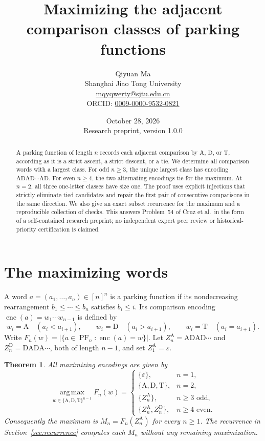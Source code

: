 \documentclass[11pt]{article}
\title{Maximizing the adjacent comparison classes of parking functions}
\author{Qiyuan Ma\\
  \small Shanghai Jiao Tong University\\
  \small \href{mailto:mqyqwerty@sjtu.edu.cn}{mqyqwerty@sjtu.edu.cn}\\
  \small ORCID: \href{https://orcid.org/0009-0000-9532-0821}{0009-0000-9532-0821}}
\date{October 28, 2026\\ \small Research preprint, version 1.0.0}
\newtheorem{theorem}{Theorem}[section]
\theoremstyle{definition}
\newcommand{\PF}{\operatorname{PF}}
\newcommand{\enc}{\operatorname{enc}}
\newcommand{\A}{\mathrm A}
\newcommand{\D}{\mathrm D}
\newcommand{\T}{\mathrm T}
\newcommand{\eps}{\varepsilon}
\begin{document}
\maketitle
\begin{abstract}
A parking function of length $n$ records each adjacent comparison by
$\A$, $\D$, or $\T$, according as it is a strict ascent, a strict descent,
or a tie. We determine all comparison words with a largest class.
For odd $n\ge3$, the unique largest class has encoding
$\A\D\A\D\cdots\A\D$. For even $n\ge4$, the two alternating
encodings tie for the maximum. At $n=2$, all three one-letter classes
have size one. The proof uses explicit injections that strictly eliminate
tied candidates and repair the first pair of consecutive comparisons
in the same direction. We also give an exact subset recurrence for the
maximum and a reproducible collection of checks. This answers
Problem~54 of Cruz et al.\ in the form of a self-contained research
preprint; no independent expert peer review or historical-priority
certification is claimed.
\end{abstract}

\section{The maximizing words}
A word $a=(a_1,\ldots,a_n)\in[n]^n$ is a parking function if its
nondecreasing rearrangement $b_1\le\cdots\le b_n$ satisfies $b_i\le i$.
Its comparison encoding $\enc(a)=w_1\cdots w_{n-1}$ is defined by
\[
w_i=\A\quad(a_i<a_{i+1}),\qquad
w_i=\D\quad(a_i>a_{i+1}),\qquad
w_i=\T\quad(a_i=a_{i+1}).
\]
Write $F_n(w)=|\{a\in\PF_n:\enc(a)=w\}|$.
Let $Z_n^\A=\A\D\A\D\cdots$ and $Z_n^\D=\D\A\D\A\cdots$,
both of length $n-1$, and set $Z_1^\A=\eps$.

\begin{theorem}\label{thm:main}
All maximizing encodings are given by
\[
\operatorname*{arg\,max}_{w\in\{\A,\D,\T\}^{n-1}}F_n(w)=
\begin{cases}
\{\eps\},&n=1,\\
\{\A,\D,\T\},&n=2,\\
\{Z_n^\A\},&n\ge3\text{ odd},\\
\{Z_n^\A,Z_n^\D\},&n\ge4\text{ even}.
\end{cases}
\]
Consequently the maximum is $M_n=F_n(Z_n^\A)$ for every $n\ge1$.
The recurrence in Section~\ref{sec:recurrence} computes each $M_n$
without any remaining maximization.
\end{theorem}
\end{document}

